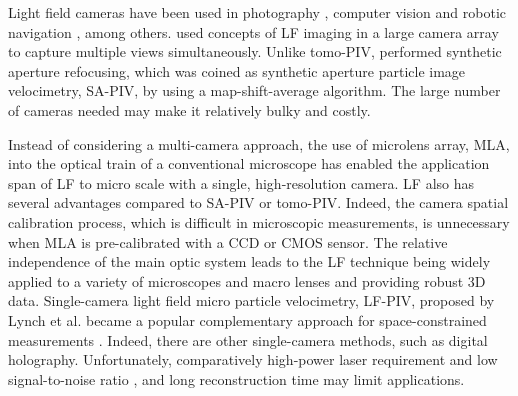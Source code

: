 \documentclass[draftthesis,fullpage]{uiucthesis}
\begin{document}
Light field cameras have been used in  photography \citep{levoy1996light, ng2005fourier}, computer vision \citep{tao2013depth, adelson1992single} and robotic navigation \citep{kaveti2020light}, among others. \citet{belden2010three} used concepts of LF imaging in a large camera array to capture multiple views simultaneously. Unlike tomo-PIV, \citet{belden2010three} performed synthetic aperture refocusing, which was coined as synthetic aperture particle image velocimetry, SA-PIV, by using a map-shift-average algorithm. The large number of cameras needed may make it relatively bulky and costly.    

Instead of considering a multi-camera approach, the use of microlens array, MLA, into the optical train of a conventional microscope  \citep{levoy2006light} has enabled the application span of LF to micro scale with a single, high-resolution camera. LF also has several advantages compared to SA-PIV or tomo-PIV. Indeed, the camera spatial calibration process, which is difficult in microscopic measurements, is unnecessary when MLA is pre-calibrated with a CCD or CMOS sensor. The relative independence of the main optic system leads to the LF technique being widely applied to a variety of microscopes and macro lenses and providing robust 3D data. Single-camera light field micro particle velocimetry, LF-PIV, proposed by Lynch et al. \cite{lynch2012three} became a popular complementary approach for space-constrained measurements \citep{shi2016dense, shi2016parametric, shi2017light, fahringer2015volumetric, xu20173d, li2017investigation}. 
Indeed, there are other single-camera methods, such as digital holography. Unfortunately, comparatively high-power laser requirement \citep{hinsch2002holographic} and low signal-to-noise ratio \citep{ooms2009digital}, and long reconstruction time may limit applications.
\end{document}
